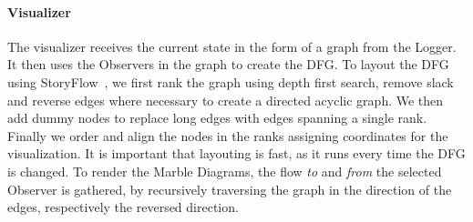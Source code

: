 \paragraph{Visualizer} The visualizer receives the current state in the
form of a graph from the Logger.  It then uses the Observers in the
graph to create the DFG.  To layout the DFG using StoryFlow~\cite{liu2013storyflow},
we first rank the graph using depth first search, remove 
slack~\cite{gansner1993technique} and
reverse edges where necessary to create a directed acyclic graph.  We
then add dummy nodes to replace long edges with edges spanning a single
rank.  Finally we order and align the nodes in the ranks assigning
coordinates for the visualization.  It is important that layouting is fast,
as it runs every time the DFG is changed.  To render the Marble Diagrams,
the flow \emph{to} and \emph{from} the selected Observer is gathered, by recursively
traversing the graph in the direction of the edges, respectively the
reversed direction.
